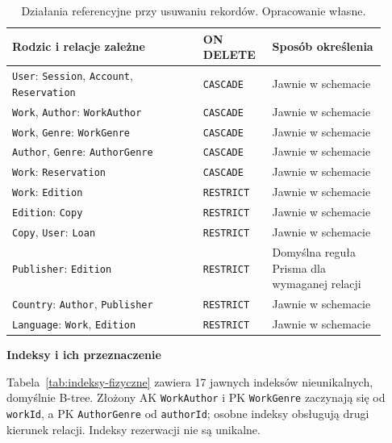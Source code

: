 \documentclass[11pt, a4paper]{article}
\begin{document}
\begin{table}[htbp]
\centering
\caption{Działania referencyjne przy usuwaniu rekordów. Opracowanie własne.}
\label{tab:usuwanie-fizyczne}
\normalsize
\begin{tabular}{@{}p{0.47\linewidth}p{0.17\linewidth}p{0.28\linewidth}@{}}
\toprule
\textbf{Rodzic i relacje zależne} & \textbf{ON DELETE} & \textbf{Sposób określenia} \\
\midrule
\texttt{User}: \texttt{Session}, \texttt{Account}, \texttt{Reservation}
& \texttt{CASCADE} & Jawnie w schemacie \\

\texttt{Work}, \texttt{Author}: \texttt{WorkAuthor}
& \texttt{CASCADE} & Jawnie w schemacie \\

\texttt{Work}, \texttt{Genre}: \texttt{WorkGenre}
& \texttt{CASCADE} & Jawnie w schemacie \\

\texttt{Author}, \texttt{Genre}: \texttt{AuthorGenre}
& \texttt{CASCADE} & Jawnie w schemacie \\

\texttt{Work}: \texttt{Reservation}
& \texttt{CASCADE} & Jawnie w schemacie \\

\texttt{Work}: \texttt{Edition}
& \texttt{RESTRICT} & Jawnie w schemacie \\

\texttt{Edition}: \texttt{Copy}
& \texttt{RESTRICT} & Jawnie w schemacie \\

\texttt{Copy}, \texttt{User}: \texttt{Loan}
& \texttt{RESTRICT} & Jawnie w schemacie \\

\texttt{Publisher}: \texttt{Edition}
& \texttt{RESTRICT} & Domyślna reguła Prisma dla wymaganej relacji \\

\texttt{Country}: \texttt{Author}, \texttt{Publisher}
& \texttt{RESTRICT} & Jawnie w schemacie \\

\texttt{Language}: \texttt{Work}, \texttt{Edition}
& \texttt{RESTRICT} & Jawnie w schemacie \\
\bottomrule
\end{tabular}
\end{table}

\noindent\textbf{Indeksy i ich przeznaczenie}

Tabela~\ref{tab:indeksy-fizyczne} zawiera 17 jawnych indeksów nieunikalnych, domyślnie B-tree. Złożony AK \texttt{WorkAuthor} i PK \texttt{WorkGenre} zaczynają się od \texttt{workId}, a PK \texttt{AuthorGenre} od \texttt{authorId}; osobne indeksy obsługują drugi kierunek relacji. Indeksy rezerwacji nie są unikalne.
\end{document}
